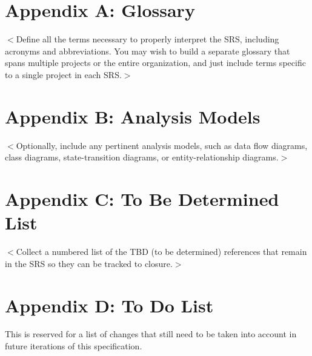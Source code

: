 \documentclass{scrreprt}
\begin{document}
\section{Appendix A: Glossary}
$<$Define all the terms necessary to properly interpret the SRS, including
acronyms and abbreviations. You may wish to build a separate glossary that spans
multiple projects or the entire organization, and just include terms specific to
a single project in each SRS.$>$

\section{Appendix B: Analysis Models}
$<$Optionally, include any pertinent analysis models, such as data flow
diagrams, class diagrams, state-transition diagrams, or entity-relationship
diagrams.$>$

\section{Appendix C: To Be Determined List}
$<$Collect a numbered list of the TBD (to be determined) references that remain
in the SRS so they can be tracked to closure.$>$

\section{Appendix D: To Do List}
This is reserved for a list of changes that still need to be taken into account in
future iterations of this specification.
\end{document}

